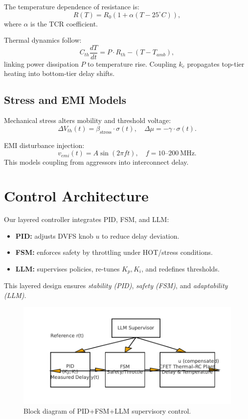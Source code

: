 \documentclass[conference]{IEEEtran}
\begin{document}
The temperature dependence of resistance is:
\begin{equation}
R(T) = R_0 \left( 1 + \alpha (T-25^\circ C) \right),
\end{equation}
where $\alpha$ is the TCR coefficient.

Thermal dynamics follow:
\begin{equation}
C_{th}\frac{dT}{dt} = P \cdot R_{th} - (T - T_{amb}),
\end{equation}
linking power dissipation $P$ to temperature rise.  
Coupling $k_c$ propagates top-tier heating into bottom-tier delay shifts.

\subsection{Stress and EMI Models}
Mechanical stress alters mobility and threshold voltage:
\begin{equation}
\Delta V_{th}(t) = \beta_{\mathrm{stress}} \cdot \sigma(t), \quad
\Delta \mu = -\gamma \cdot \sigma(t).
\end{equation}

EMI disturbance injection:
\begin{equation}
v_{emi}(t) = A \sin(2\pi f t), \quad f = 10\text{--}200~\mathrm{MHz}.
\end{equation}
This models coupling from aggressors into interconnect delay.

\section{Control Architecture}
Our layered controller integrates PID, FSM, and LLM:
\begin{itemize}
  \item \textbf{PID:} adjusts DVFS knob $u$ to reduce delay deviation.
  \item \textbf{FSM:} enforces safety by throttling under HOT/stress conditions.
  \item \textbf{LLM:} supervises policies, re-tunes $K_p,K_i$, and redefines thresholds.
\end{itemize}
This layered design ensures \emph{stability (PID)}, \emph{safety (FSM)}, and \emph{adaptability (LLM)}.

\begin{figure}[h]
\centering
\includegraphics[width=0.9\columnwidth]{figs/control_arch.pdf}
\caption{Block diagram of PID+FSM+LLM supervisory control.}
\label{fig:arch}
\end{figure}
\end{document}
